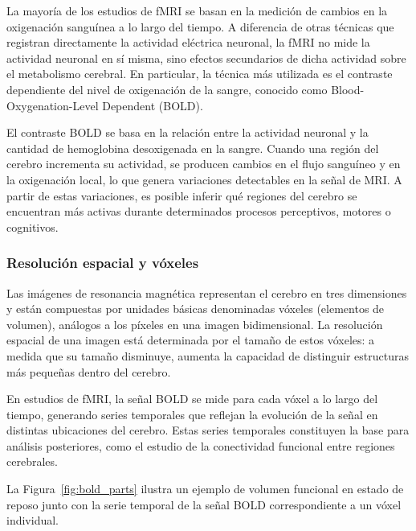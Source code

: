 La mayoría de los estudios de fMRI se basan en la medición de cambios en la oxigenación sanguínea a lo largo del tiempo. A diferencia de otras técnicas que registran directamente la actividad eléctrica neuronal, la fMRI no mide la actividad neuronal en sí misma, sino efectos secundarios de dicha actividad sobre el metabolismo cerebral. En particular, la técnica más utilizada es el contraste dependiente del nivel de oxigenación de la sangre, conocido como Blood-Oxygenation-Level Dependent (BOLD).

El contraste BOLD se basa en la relación entre la actividad neuronal y la cantidad de hemoglobina desoxigenada en la sangre. Cuando una región del cerebro incrementa su actividad, se producen cambios en el flujo sanguíneo y en la oxigenación local, lo que genera variaciones detectables en la señal de MRI. A partir de estas variaciones, es posible inferir qué regiones del cerebro se encuentran más activas durante determinados procesos perceptivos, motores o cognitivos.

\subsubsection{Resolución espacial y vóxeles}

Las imágenes de resonancia magnética representan el cerebro en tres dimensiones y están compuestas por unidades básicas denominadas vóxeles (elementos de volumen), análogos a los píxeles en una imagen bidimensional. La resolución espacial de una imagen está determinada por el tamaño de estos vóxeles: a medida que su tamaño disminuye, aumenta la capacidad de distinguir estructuras más pequeñas dentro del cerebro.

En estudios de fMRI, la señal BOLD se mide para cada vóxel a lo largo del tiempo, generando series temporales que reflejan la evolución de la señal en distintas ubicaciones del cerebro. Estas series temporales constituyen la base para análisis posteriores, como el estudio de la conectividad funcional entre regiones cerebrales.

La Figura~\ref{fig:bold_parts} ilustra un ejemplo de volumen funcional en estado de reposo junto con la serie temporal de la señal BOLD correspondiente a un vóxel individual.

